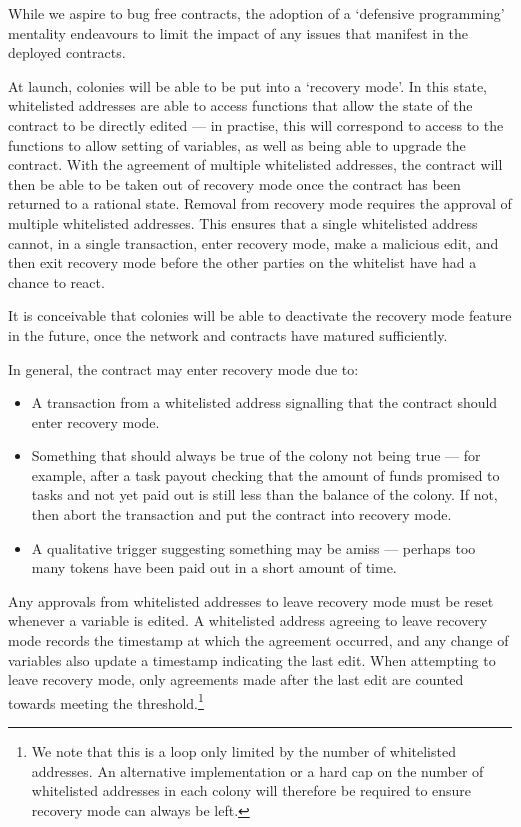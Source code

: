 While we aspire to bug free contracts, the adoption of a `defensive programming' mentality endeavours to limit the impact of any issues that manifest in the deployed contracts.

At launch, colonies will be able to be put into a `recovery mode'. In this state, whitelisted addresses are able to access functions that allow the state of the contract to be directly edited --- in practise, this will correspond to access to the functions to allow setting of variables, as well as being able to upgrade the contract. With the agreement of multiple whitelisted addresses, the contract will then be able to be taken out of recovery mode once the contract has been returned to a rational state. Removal from recovery mode requires the approval of multiple whitelisted addresses. This ensures that a single whitelisted address cannot, in a single transaction, enter recovery mode, make a malicious edit, and then exit recovery mode before the other parties on the whitelist have had a chance to react.

It is conceivable that colonies will be able to deactivate the recovery mode feature in the future, once the network and contracts have matured sufficiently.

In general, the contract may enter recovery mode due to:

\begin{itemize}
 \item A transaction from a whitelisted address signalling that the contract should enter recovery mode.
 \item Something that should always be true of the colony not being true --- for example, after a task payout checking that the amount of funds promised to tasks and not yet paid out is still less than the balance of the colony. If not, then abort the transaction and put the contract into recovery mode.
 \item A qualitative trigger suggesting something may be amiss --- perhaps too many tokens have been paid out in a short amount of time.
\end{itemize}

Any approvals from whitelisted addresses to leave recovery mode must be reset whenever a variable is edited. A whitelisted address agreeing to leave recovery mode records the timestamp at which the agreement occurred, and any change of variables also update a timestamp indicating the last edit. When attempting to leave recovery mode, only agreements made after the last edit are counted towards meeting the threshold.\footnote{We note that this is a loop only limited by the number of whitelisted addresses. An alternative implementation or a hard cap on the number of whitelisted addresses in each colony will therefore be required to ensure recovery mode can always be left.}

